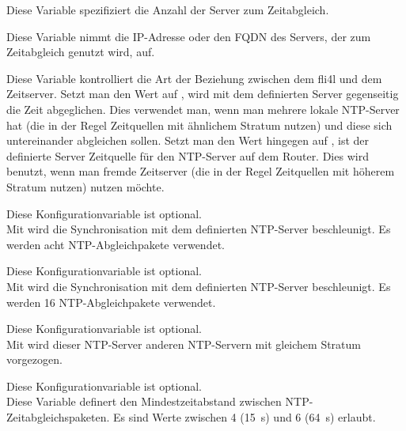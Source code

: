 \begin{description}

  Diese Variable spezifiziert die Anzahl der Server zum Zeitabgleich.


  Diese Variable nimmt die IP-Adresse oder den FQDN des Servers, der zum
  Zeitabgleich genutzt wird, auf.
  

  Diese Variable kontrolliert die Art der Beziehung zwischen dem fli4l und dem
  Zeitserver. Setzt man den Wert auf , wird mit dem definierten
  Server gegenseitig die Zeit abgeglichen. Dies verwendet man, wenn man mehrere
  lokale NTP-Server hat (die in der Regel Zeitquellen mit ähnlichem
  Stratum nutzen) und diese sich untereinander abgleichen sollen. Setzt man den
  Wert hingegen auf , ist der definierte Server Zeitquelle für
  den NTP-Server auf dem Router. Dies wird benutzt, wenn man fremde Zeitserver
  (die in der Regel Zeitquellen mit höherem Stratum nutzen) nutzen möchte.
 

  Diese Konfigurationvariable ist optional.\\
  Mit  wird die Synchronisation mit dem definierten
  NTP-Server beschleunigt. Es werden acht NTP-Abgleichpakete verwendet.


  Diese Konfigurationvariable ist optional.\\
  Mit  wird die Synchronisation mit dem definierten
  NTP-Server beschleunigt. Es werden 16 NTP-Abgleichpakete verwendet.


  Diese Konfigurationvariable ist optional.\\
  Mit  wird dieser NTP-Server anderen NTP-Servern mit gleichem
  Stratum vorgezogen.


  Diese Konfigurationvariable ist optional.\\
  Diese Variable definert den Mindestzeitabstand zwischen
  NTP-Zeitabgleichspaketen. Es sind Werte zwischen 4 (15~s) und 6 (64~s)
  erlaubt.


\end{description}

